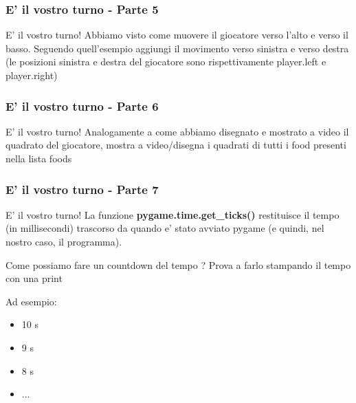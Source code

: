 \begin{frame}[fragile]
\frametitle{E' il vostro turno - Parte 5}
\begin{block}{E' il vostro turno!}
Abbiamo visto come muovere il giocatore verso l'alto e verso il basso. Seguendo quell'esempio aggiungi il movimento verso sinistra e verso destra (le posizioni sinistra e destra del giocatore sono rispettivamente player.left e player.right) 
\end{block}

\end{frame}

\begin{frame}[fragile]
\frametitle{E' il vostro turno - Parte 6}
\begin{block}{E' il vostro turno!}
Analogamente a come abbiamo disegnato e mostrato a video il quadrato del giocatore, mostra a video/disegna i quadrati di tutti i food presenti nella lista foods
\end{block}

\end{frame}

\begin{frame}[fragile]
\frametitle{E' il vostro turno - Parte 7}
\begin{block}{E' il vostro turno!}
La funzione \textbf{ pygame.time.get\_ticks() } restituisce il tempo (in millisecondi) trascorso da quando e' stato avviato pygame (e quindi, nel nostro caso, il programma).

\vspace{5mm}
Come possiamo fare un countdown del tempo       ?
Prova a farlo stampando il tempo con una print

Ad esempio:
\begin{itemize}
    \item 10 s
    \item 9 s
    \item 8 s 
    \item ...
\end{itemize}
\end{block}

\end{frame}